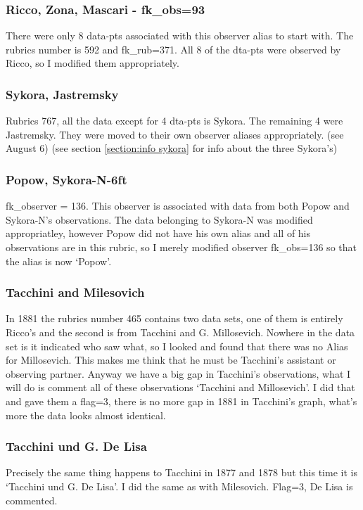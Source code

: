 \documentclass[12pt]{article}
\begin{document}
\subsubsection{Ricco, Zona, Mascari - fk\_obs=93}
There were only 8 data-pts associated with this observer alias to start with. The rubrics number is 592 and fk\_rub=371. All 8 of the dta-pts were observed by Ricco, so I modified them appropriately.

\subsubsection{Sykora, Jastremsky}
Rubrics 767, all the data except for 4 dta-pts is Sykora. The remaining 4 were Jastremsky. They were moved to their own observer aliases appropriately. (see August 6) (see section \ref{section:info sykora} for info about the three Sykora's)

\subsubsection{Popow, Sykora-N-6ft}
fk\_observer = 136. This observer is associated with data from both Popow and Sykora-N's observations. The data belonging to Sykora-N was modified appropriatley, however Popow did not have his own alias and all of his observations are in this rubric, so I merely modified observer fk\_obs=136 so that the alias is now `Popow'.

\subsubsection{Tacchini and Milesovich}
In 1881 the rubrics number 465 contains two data sets, one of them is entirely Ricco's and the second is from Tacchini and G. Millosevich. Nowhere in the data set is it indicated who saw what, so I looked and found that there was no Alias for Millosevich. This makes me think that he must be Tacchini's assistant or observing partner. Anyway we have a big gap in Tacchini's observations, what I will do is comment all of these observations `Tacchini and Millosevich'. I did that and gave them a flag=3, there is no more gap in 1881 in Tacchini's graph, what's more the data looks almost identical. 

\subsubsection{Tacchini und G. De Lisa}
Precisely the same thing happens to Tacchini in 1877 and 1878 but this time it is `Tacchini und G. De Lisa'. I did the same as with Milesovich. Flag=3, De Lisa is commented. 
\end{document}
